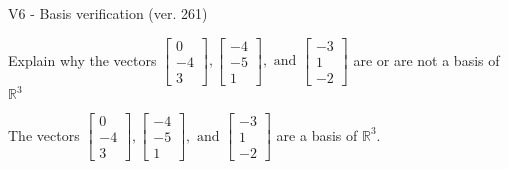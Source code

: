 \begin{exercise}
  \begin{exerciseTitle}V6 - Basis verification (ver. 261)\end{exerciseTitle}
  \begin{exerciseStatement}
    Explain why the vectors \(\left[\begin{array}{r}
0 \\
-4 \\
3
\end{array}\right] , \left[\begin{array}{r}
-4 \\
-5 \\
1
\end{array}\right] , \text{ and } \left[\begin{array}{r}
-3 \\
1 \\
-2
\end{array}\right]\) are or are not a basis of \(\mathbb{R}^3\)	


  \end{exerciseStatement}
  \begin{exerciseAnswer}
   The vectors \(\left[\begin{array}{r}
0 \\
-4 \\
3
\end{array}\right] , \left[\begin{array}{r}
-4 \\
-5 \\
1
\end{array}\right] , \text{ and } \left[\begin{array}{r}
-3 \\
1 \\
-2
\end{array}\right]\) 
  	 are  a basis of \(\mathbb{R}^3\).
  


  \end{exerciseAnswer}
\end{exercise}